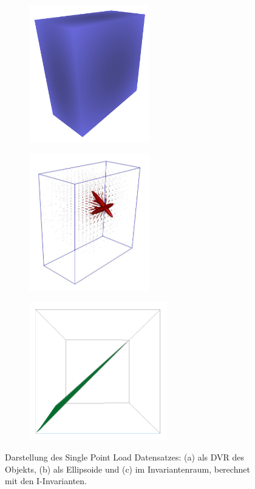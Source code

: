 \documentclass[a4paper,fontsize=12pt,toc=bib,halfparskip,ngerman]{scrartcl}
\begin{document}
\begin{figure}
		\begin{subfigure}{0.3\textwidth}
		\centering
		\includegraphics[height=6cm]{pictures/results/SinglePoint/SinglePoint_Object.png}
		\subcaption{}
		\label{SinglePointObject}
	\end{subfigure}
	\hspace*{\fill}
	\begin{subfigure}{0.3\textwidth}
		\centering
		\includegraphics[height=6cm]{pictures/results/SinglePoint/SinglePoint_Ellipsoids.png}
		\subcaption{}
		\label{SinglePointEllipsoids}
	\end{subfigure}
	\hspace*{\fill}
	\begin{subfigure}{0.3\textwidth}
		\centering
		\includegraphics[height=6cm]{pictures/results/SinglePoint/SinglePoint_InvariantSpace.png}
		\subcaption{}
		\label{SinglePointInvariantSpace}
	\end{subfigure}
	\caption{Darstellung des Single Point Load Datensatzes: (a) als DVR des Objekts, (b) als Ellipsoide und (c) im Invariantenraum, berechnet mit den I-Invarianten.}
	\label{SinglePoint}
\end{figure}
\end{document}
